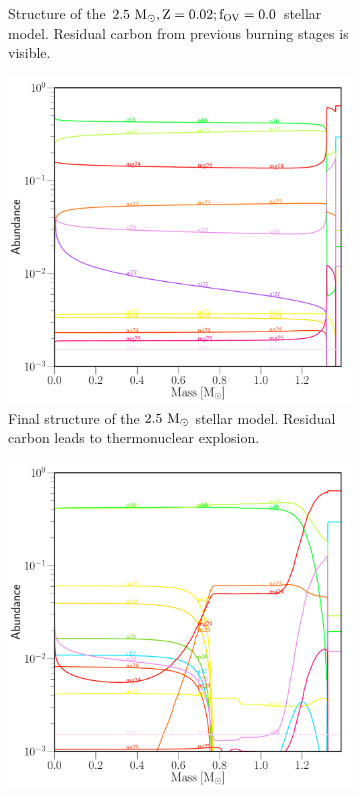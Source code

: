 \documentclass[../../main/thesis_msc.tex]{subfiles}
\begin{document}
\begin{figure}
\begin{subfigure}[b]{.45\linewidth}
\caption{Structure of the $2.5 \rm \ M_{\odot},  Z=0.02;f_{OV}=0.0$ stellar model. Residual carbon from previous burning stages is visible.}\label{fig:abun_b}
\end{subfigure}
\hfill
\begin{subfigure}[b]{.45\linewidth}
 \includegraphics[width=\textwidth]{../figures/chapter4/2p5_final_abun.pdf}
\caption{Final structure of the $2.5 \rm \ M_{\odot}$ stellar model. Residual carbon leads to thermonuclear explosion.}\label{fig:abun_c}
\hfill
\end{subfigure}
\hfill
\begin{subfigure}[b]{.45\linewidth}
\includegraphics[width=\textwidth]{../figures/chapter4/2p5_abun_carbon_sup.pdf}

\end{subfigure}
\end{figure}
\end{document}
